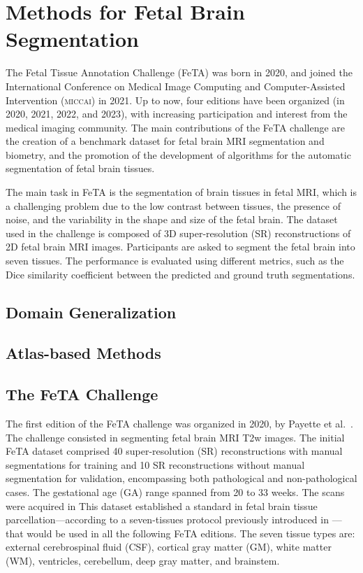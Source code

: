 \chapter{Methods for Fetal Brain Segmentation} \label{chap:MethodsForFetalBrainSegmentation}
\vspace{1cm}

The Fetal Tissue Annotation Challenge (FeTA) \cite{FeTA2024} was born in 2020, and joined the International Conference on Medical Image Computing and Computer-Assisted Intervention (\textsc{miccai}) \cite{MICCAI} in 2021. Up to now, four editions have been organized (in 2020, 2021, 2022, and 2023), with increasing participation and interest from the medical imaging community. The main contributions of the FeTA challenge are the creation of a benchmark dataset for fetal brain MRI segmentation and biometry, and the promotion of the development of algorithms for the automatic segmentation of fetal brain tissues.

The main task in FeTA is the segmentation of brain tissues in fetal MRI, which is a challenging problem due to the low contrast between tissues, the presence of noise, and the variability in the shape and size of the fetal brain. The dataset used in the challenge is composed of 3D super-resolution (SR) reconstructions of 2D fetal brain MRI images. Participants are asked to segment the fetal brain into seven tissues. The performance is evaluated using different metrics, such as the Dice similarity coefficient between the predicted and ground truth segmentations. \cite{FeTA2024_paper}

\section{Domain Generalization}

\section{Atlas-based Methods}

\section{The FeTA Challenge}

The first edition of the FeTA challenge was organized in 2020, by Payette et al.\ \cite{FeTA2020_review}. The challenge consisted in segmenting fetal brain MRI T2w images. The initial FeTA dataset comprised 40 super-resolution (SR) reconstructions with manual segmentations for training and 10 SR reconstructions without manual segmentation for validation, encompassing both pathological and non-pathological cases. The gestational age (GA) range spanned from 20 to 33 weeks. The scans were acquired in This dataset established a standard in fetal brain tissue parcellation---according to a seven-tissues protocol previously introduced in \cite{Payette2020}---that would be used in all the following FeTA editions. The seven tissue types are: external cerebrospinal fluid (CSF), cortical gray matter (GM), white matter (WM), ventricles, cerebellum, deep gray matter, and brainstem.

